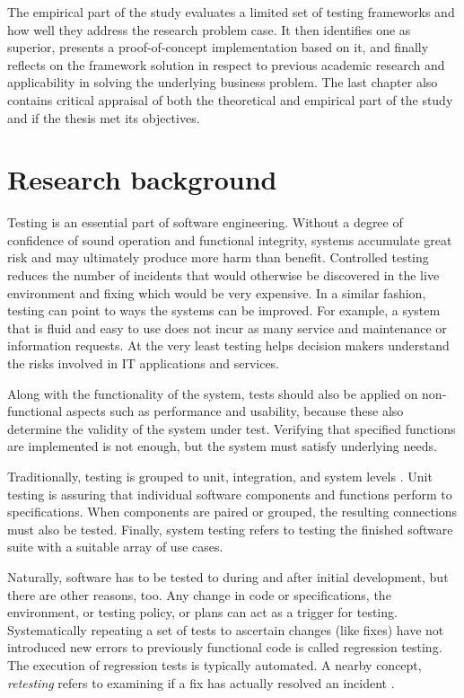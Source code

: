 \documentclass[12pt,a4paper,oneside,pdftex]{report}
\begin{document}
The empirical part of the study evaluates a limited set of testing frameworks and how well they address the research problem case. It then identifies one as superior, presents a proof-of-concept implementation based on it, and finally reflects on the framework solution in respect to previous academic research and applicability in solving the underlying business problem. The last chapter also contains critical appraisal of both the theoretical and empirical part of the study and if the thesis met its objectives.

\chapter{Research background}
\label{chapter:background}

Testing is an essential part of software engineering. Without a degree of confidence of sound operation and functional integrity, systems accumulate great risk and may ultimately produce more harm than benefit. Controlled testing reduces the number of incidents that would otherwise be discovered in the live environment and fixing which would be very expensive. In a similar fashion, testing can point to ways the systems can be improved. For example, a system that is fluid and easy to use does not incur as many service and maintenance or information requests. At the very least testing helps decision makers understand the risks involved in IT applications and services.

Along with the functionality of the system, tests should also be applied on non-functional aspects such as performance and usability, because these also determine the validity of the system under test. Verifying that specified functions are implemented is not enough, but the system must satisfy underlying needs.

Traditionally, testing is grouped to unit, integration, and system levels \citep{jenkins2008software, burnstein2003practical}. Unit testing is assuring that individual software components and functions perform to specifications. When components are paired or grouped, the resulting connections must also be tested. Finally, system testing refers to testing the finished software suite with a suitable array of use cases.


Naturally, software has to be tested to during and after initial development, but there are other reasons, too. Any change in code or specifications, the environment, or testing policy, or plans can act as a trigger for testing. Systematically repeating a set of tests to ascertain changes (like fixes) have not introduced new errors to previously functional code is called regression testing. The execution of regression tests is typically automated. A nearby concept, \textit{retesting} refers to examining if a fix has actually resolved an incident \citep{jenkins2008software}.
\end{document}

